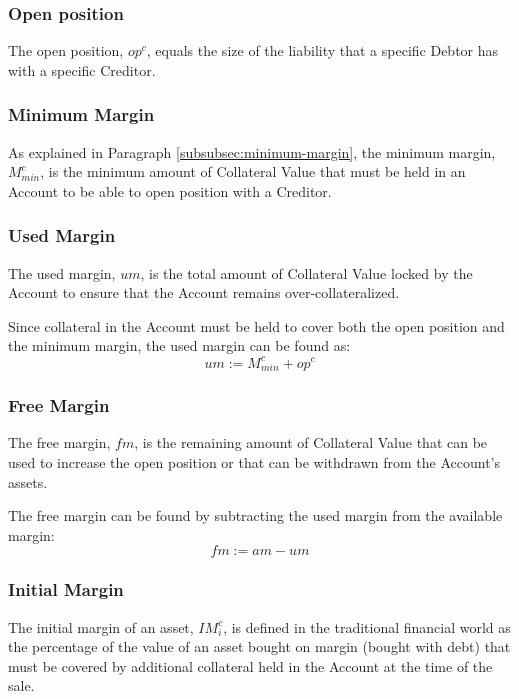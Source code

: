 \documentclass[sigconf,nonacm]{acmart}
\begin{document}
\subsubsection{Open position}
The open position, $op^c$, equals the size of the liability that a specific Debtor has with a specific Creditor.

\subsubsection{Minimum Margin}
As explained in Paragraph \ref{subsubsec:minimum-margin}, the minimum margin, $M_{min}^c$, 
is the minimum amount of Collateral Value that must be held in an Account to be able to open position with a Creditor.

\subsubsection{Used Margin}
The used margin, $um$, is the total amount of Collateral Value locked by the Account to ensure that the Account remains over-collateralized.

Since collateral in the Account must be held to cover both the open position and the minimum margin, the used margin can be found as:
\begin{equation}
    um := M_{min}^c + op^c
\end{equation}

\subsubsection{Free Margin}
The free margin, $fm$, is the remaining amount of Collateral Value that can be used to increase the open position or that can be withdrawn from the Account's assets.

The free margin can be found by subtracting the used margin from the available margin:
\begin{equation}
    \label{eq:free-margin}
    fm := am - um
\end{equation}

\subsubsection{Initial Margin}
\label{subsubsec:initial-margin}
The initial margin of an asset, $IM_{i}^{c}$, is defined in the traditional financial world as the percentage of the value of an asset bought on margin (bought with debt)
that must be covered by additional collateral held in the Account at the time of the sale.
\end{document}
